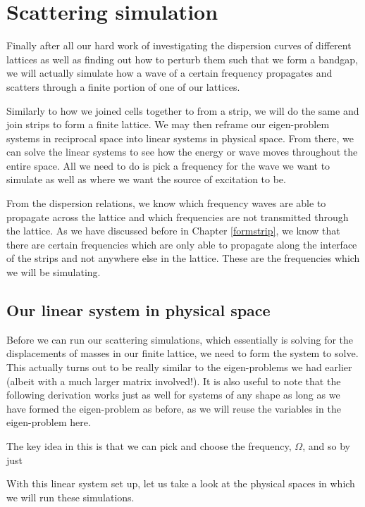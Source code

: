\chapter{Scattering simulation}
\label{scattering}
Finally after all our hard work of investigating the dispersion curves of
different lattices as well as finding out how to perturb them such that we form
a bandgap, we will actually simulate how a wave of a certain frequency
propagates and scatters through a finite portion of one of our lattices.

Similarly to how we joined cells together to from a strip, we will do the same
and join strips to form a finite lattice. We may then reframe our eigen-problem
systems in reciprocal space into linear systems in physical space. From there,
we can solve the linear systems to see how the energy or wave moves throughout
the entire space. All we need to do is pick a frequency for the wave we want to
simulate as well as where we want the source of excitation to be.

From the dispersion relations, we know which frequency waves are able to
propagate across the lattice and which frequencies are not transmitted through
the lattice. As we have discussed before in Chapter \ref{formstrip}, we know
that there are certain frequencies which are only able to propagate along the
interface of the strips and not anywhere else in the lattice. These are the
frequencies which we will be simulating.

\section{Our linear system in physical space}
Before we can run our scattering simulations, which essentially is solving for
the displacements of masses in our finite lattice, we need to form the system
to solve. This actually turns out to be really similar to the eigen-problems we
had earlier (albeit with a much larger matrix involved!). It is also useful to
note that the following derivation works just as well for systems of any shape
as long as we have formed the eigen-problem as before, as we will reuse the
variables in the eigen-problem here.
 
The key idea in this is that we can pick and choose the frequency, $\Omega$,
and so by just

With this linear system set up, let us take a look at the physical spaces in
which we will run these simulations.

